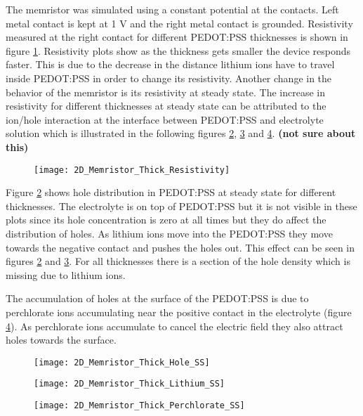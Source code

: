 The memristor was simulated using a constant potential at the contacts. Left metal contact is kept at 1 V and the right metal contact is grounded. Resistivity measured at the right contact for different PEDOT:PSS thicknesses is shown in figure \ref{thick_resistivity}. Resistivity plots show as the thickness gets smaller the device responds faster. This is due to the decrease in the distance lithium ions have to travel inside PEDOT:PSS in order to change its resistivity. Another change in the behavior of the memristor is its resistivity at steady state. The increase in resistivity for different thicknesses at steady state can be attributed to the ion/hole interaction at the interface between PEDOT:PSS and electrolyte solution which is illustrated in the following figures \ref{thick_p_ss}, \ref{thick_li_ss} and \ref{thick_perch_ss}. \textbf{(not sure about this)}

\begin{figure}[!htp]
\centering
\texttt{[image: 2D\_Memristor\_Thick\_Resistivity]}
\caption{} 
\label{thick_resistivity}
\end{figure}

Figure \ref{thick_p_ss} shows hole distribution in PEDOT:PSS at steady state for different thicknesses. The electrolyte is on top of PEDOT:PSS but it is not visible in these plots since its hole concentration is zero at all times but they do affect the distribution of holes. As lithium ions move into the PEDOT:PSS they move towards the negative contact and pushes the holes out. This effect can be seen in figures \ref{thick_p_ss} and  \ref{thick_li_ss}. For all thicknesses there is a section of the hole density which is missing due to lithium ions.

The accumulation of holes at the surface of the PEDOT:PSS is due to perchlorate ions accumulating near the positive contact in the electrolyte (figure \ref{thick_perch_ss}). As perchlorate ions accumulate to cancel the electric field they also attract holes towards the surface.
\begin{figure}[!htp]
\centering
\texttt{[image: 2D\_Memristor\_Thick\_Hole\_SS]}
\caption{} 
\label{thick_p_ss}
\end{figure}

\begin{figure}[!htp]
\centering
\texttt{[image: 2D\_Memristor\_Thick\_Lithium\_SS]}
\caption{} 
\label{thick_li_ss}
\end{figure}

\begin{figure}[!htp]
\centering
\texttt{[image: 2D\_Memristor\_Thick\_Perchlorate\_SS]}
\caption{} 
\label{thick_perch_ss}
\end{figure}

